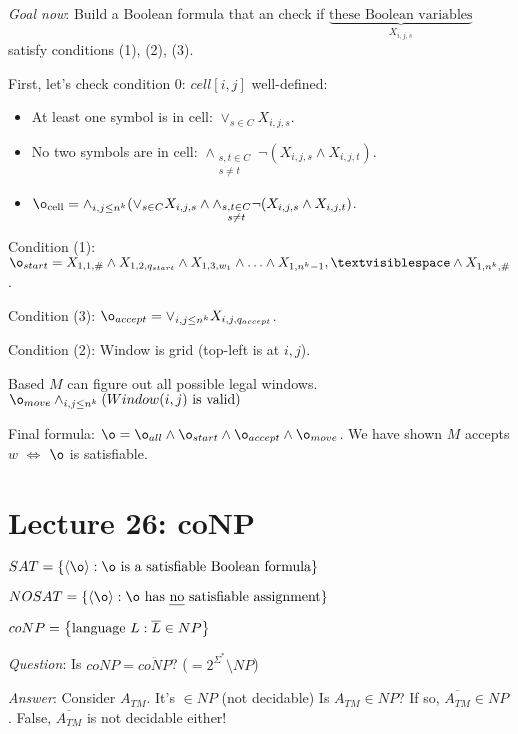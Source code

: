 \emph{Goal now}: Build a Boolean formula that an check if $\underbrace{\text{these Boolean variables}}_{X_{i, j, s}}$ satisfy conditions (1), (2), (3).

First, let's check condition 0: $cell[i, j] $ well-defined:

\begin{itemize}
    \item At least one symbol is in cell: $\vee_{s \in C} X_{i, j, s}$.
    \item No two symbols are in cell: $\wedge_{\substack{s, t \in C\\ s \neq t}} \neg (X_{i, j, s} \wedge X_{i, j, t})$.
    \item $\o_{\text{cell}} = \wedge_{i, j \leq n^k} (\vee_{s \in C} X_{i, j, s} \wedge \wedge_{\substack{s, t \in C\\ s \neq t}} \neg (X_{i, j, s} \wedge X_{i, j, t})$.
\end{itemize}

Condition (1): $\o_{start} = X_{1, 1, \#} \wedge X_{1, 2, q_{start}} \wedge X_{1, 3, w_1} \wedge \ldots \wedge X_{1, n^k-1}, \textvisiblespace \wedge X_{1, n^k, \#}$.

Condition (3): $\o_{accept} = \vee_{i, j \leq n^k} X_{i, j, q_{accept}}$.

Condition (2): Window is grid (top-left is at $i, j$).

Based $M$ can figure out all possible legal windows. $\o_{move} \wedge_{i, j \leq n^k} (Window(i, j) \text{ is valid})$

Final formula: $\o = \o_{all} \wedge \o_{start} \wedge \o_{accept} \wedge \o_{move}$. We have shown $M$ accepts $w$ $\Leftrightarrow$ $\o$ is satisfiable.

\section*{Lecture 26: coNP}

$SAT = \set{\encoding{\o} : \o \text{ is a satisfiable Boolean formula}}$

$NOSAT = \set{\encoding{\o} : \o \text{ has \emph{no} satisfiable assignment}}$

\begin{definition}
    $coNP = \left \{ \text{language } L: \overline{L} \in NP \right \}$
\end{definition}

\emph{Question}: Is $coNP = \overline{coNP}$? ($= 2^{\Sigma^*} \setminus NP$)

\emph{Answer}: Consider $A_{TM}$. It's $\in NP$ (not decidable) Is $A_{TM} \in NP$? If so, $\overline{A_{TM}} \in NP$. False, $\overline{A_{TM}}$ is not decidable either!

